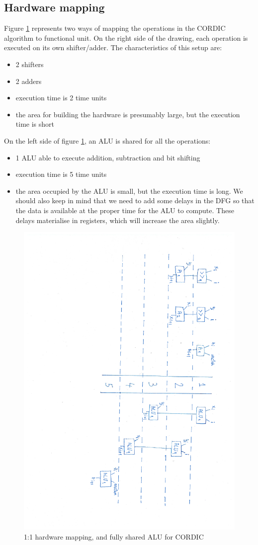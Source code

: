 \documentclass[12pt, a4paper,oneside]{article}
\begin{document}
\subsection{Hardware mapping} \label{hw_mapping}
Figure \ref{fig:schedules} represents two ways of mapping the operations in the
CORDIC algorithm to functional unit. On the right side of the drawing, each operation
is executed on its own shifter/adder. The characteristics of this setup are:

\begin{itemize}
	\item 2 shifters
	\item 2 adders
	\item execution time is 2 time units
	\item the area for building the hardware is presumably large, but the execution time
	is short
\end{itemize}


On the left side of figure \ref{fig:schedules}, an ALU is shared for all the
operations:

\begin{itemize}
	\item 1 ALU able to execute addition, subtraction and bit shifting
	\item execution time is 5 time units
	\item the area occupied by the ALU is small, but the execution time is long.
	We should also keep in mind that we need to add some delays in the DFG so
	that the data is available at the proper time for the ALU to compute.
	These delays materialise in registers, which will increase the area slightly.
\end{itemize}

\begin{figure}[h]
	\centering
	\includegraphics[height = \textwidth,angle=91, trim=6.5cm 3.5cm 1.5cm 3cm, clip]{schedules.pdf}
	\caption{1:1 hardware mapping, and fully shared ALU for CORDIC}
	\label{fig:schedules}
\end{figure}
\end{document}
